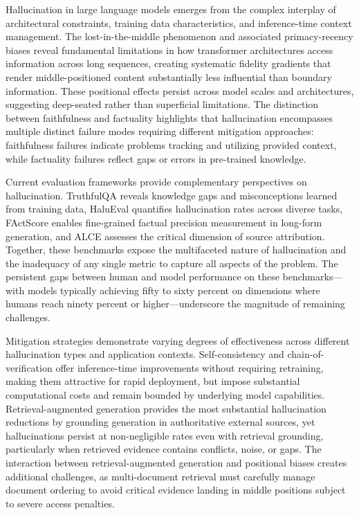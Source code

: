 Hallucination in large language models emerges from the complex interplay of architectural constraints, training data characteristics, and inference-time context management. The lost-in-the-middle phenomenon and associated primacy-recency biases reveal fundamental limitations in how transformer architectures access information across long sequences, creating systematic fidelity gradients that render middle-positioned content substantially less influential than boundary information. These positional effects persist across model scales and architectures, suggesting deep-seated rather than superficial limitations. The distinction between faithfulness and factuality highlights that hallucination encompasses multiple distinct failure modes requiring different mitigation approaches: faithfulness failures indicate problems tracking and utilizing provided context, while factuality failures reflect gaps or errors in pre-trained knowledge.

Current evaluation frameworks provide complementary perspectives on hallucination. TruthfulQA reveals knowledge gaps and misconceptions learned from training data, HaluEval quantifies hallucination rates across diverse tasks, FActScore enables fine-grained factual precision measurement in long-form generation, and ALCE assesses the critical dimension of source attribution. Together, these benchmarks expose the multifaceted nature of hallucination and the inadequacy of any single metric to capture all aspects of the problem. The persistent gaps between human and model performance on these benchmarks---with models typically achieving fifty to sixty percent on dimensions where humans reach ninety percent or higher---underscore the magnitude of remaining challenges.

Mitigation strategies demonstrate varying degrees of effectiveness across different hallucination types and application contexts. Self-consistency and chain-of-verification offer inference-time improvements without requiring retraining, making them attractive for rapid deployment, but impose substantial computational costs and remain bounded by underlying model capabilities. Retrieval-augmented generation provides the most substantial hallucination reductions by grounding generation in authoritative external sources, yet hallucinations persist at non-negligible rates even with retrieval grounding, particularly when retrieved evidence contains conflicts, noise, or gaps. The interaction between retrieval-augmented generation and positional biases creates additional challenges, as multi-document retrieval must carefully manage document ordering to avoid critical evidence landing in middle positions subject to severe access penalties.

